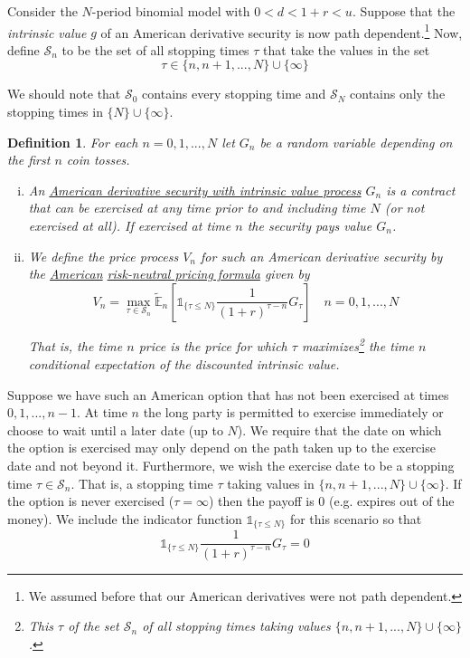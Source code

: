 \documentclass[12pt]{article}
\newtheorem{definition}{Definition}
\newlength\tindent
\renewcommand{\indent}{\hspace*{\tindent}}
\newcommand{\E}{\mathbb E}
\begin{document}
Consider the $N$-period binomial model with $0 < d < 1 + r < u$. Suppose that the {\em intrinsic value} $g$ of an American derivative security is now path dependent.\footnote{We assumed before that our American derivatives were not path dependent.} Now, define $\mathcal S_n$ to be the set of all stopping times $\tau$ that take the values in the set
\begin{equation*}
	\tau \in \{n, n + 1, ..., N\}\cup \{\infty\}
\end{equation*}

\indent We should note that $\mathcal S_0$ contains every stopping time and $\mathcal S_N$ contains only the stopping times in $\{N\}\cup\{\infty\}$. \\

\begin{definition} For each $n = 0,1,...,N$ let $G_n$ be a random variable depending on the first $n$ coin tosses. 
\begin{enumerate}[(i)]
	\item An \underline{American derivative security with intrinsic value process} $G_n$ is a contract that can be exercised at any time prior to and including time $N$ (or not exercised at all). If exercised at time $n$ the security pays value $G_n$.
	\item We define the price process $V_n$ for such an American derivative security by the \underline{American} \underline{risk-neutral pricing formula} given by
	\begin{equation*}
		V_n = \max_{\tau \in \mathcal S_n} \tilde{\E}_n \left[ \mathds 1_{\{\tau \leq N\}} \frac{1}{(1 + r)^{\tau - n}} G_{\tau} \right] \quad n = 0,1,...,N
	\end{equation*}
	
	That is, the time $n$ price is the price for which $\tau$ maximizes\footnote{This $\tau$ of the set $\mathcal S_n$ of all stopping times taking values $\{n, n + 1, ..., N\} \cup \{\infty\}$.} the time $n$ conditional expectation of the discounted intrinsic value.
\end{enumerate}
\end{definition}

\indent Suppose we have such an American option that has not been exercised at times $0,1,...,n - 1$. At time $n$ the long party is permitted to exercise immediately or choose to wait until a later date (up to $N$). We require that the date on which the option is exercised may only depend on the path taken up to the exercise date and not beyond it. Furthermore, we wish the exercise date to be a stopping time $\tau \in \mathcal S_n$. That is, a stopping time $\tau$ taking values in $\{n, n + 1,..., N\}\cup \{\infty\}$. If the option is never exercised ($\tau = \infty$) then the payoff is 0 (e.g. expires out of the money). We include the indicator function $\mathds 1_{\{\tau\leq N\}}$ for this scenario so that
\begin{equation*}
	\mathds 1_{\{\tau \leq N\}} \frac{1}{(1 + r)^{\tau - n}} G_{\tau} = 0
\end{equation*}
\end{document}

